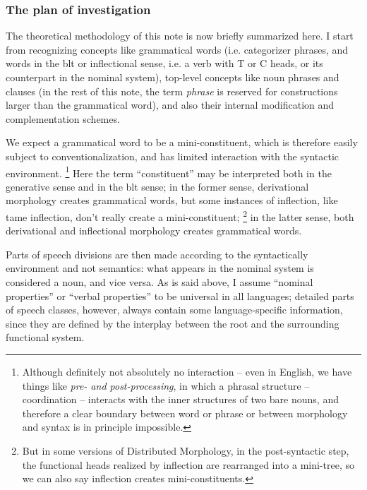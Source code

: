 \documentclass[UTF8, a4paper, oneside, scheme=plain, 12pt]{ctexrep}
\newcommand*{\term}[1]{\emph{#1}}
\newcommand{\form}[1]{\emph{#1}}
\begin{document}
{\subsubsection{The plan of investigation}

The theoretical methodology of this note is now briefly summarized here.
I start from recognizing concepts like grammatical words 
(i.e. categorizer phrases, and words in the \acs{blt} or inflectional sense, 
i.e. a verb with T or C heads, or its counterpart in the nominal system), 
top-level concepts like noun phrases and clauses
(in the rest of this note, the term \term{phrase} is reserved 
for constructions larger than the grammatical word), 
and also their internal modification and complementation schemes. 

We expect a grammatical word to be a mini-constituent, 
which is therefore easily subject to conventionalization, 
and has limited interaction with the syntactic environment.%
\footnote{
    Although definitely not absolutely no interaction -- 
    even in English, we have things like \form{pre- and post-processing}, 
    in which a phrasal structure -- coordination -- interacts 
    with the inner structures of two bare nouns, 
    and therefore a clear boundary between word or phrase 
    or between morphology and syntax is in principle impossible.
}
Here the term ``constituent'' may be interpreted 
both in the generative sense and in the \acs{blt} sense; 
in the former sense, derivational morphology creates grammatical words, 
but some instances of inflection, like \acs{tame} inflection, 
don't really create a mini-constituent;%
\footnote{
    But in some versions of Distributed Morphology, 
    in the post-syntactic step, 
    the functional heads realized by inflection are rearranged into a mini-tree, 
    so we can also say inflection creates mini-constituents.
} 
in the latter sense, both derivational and inflectional morphology
creates grammatical words. 

Parts of speech divisions are then made according to the 
syntactically environment and not semantics: 
what appears in the nominal system is considered a noun, 
and vice versa. 
As is said above, 
I assume ``nominal properties'' or ``verbal properties'' 
to be universal in all languages; 
detailed parts of speech classes, however, 
always contain some language-specific information,
since they are defined by the interplay 
between the root and the surrounding functional system. 

}
\end{document}
